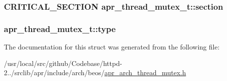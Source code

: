 \subsubsection[{\texorpdfstring{section}{section}}]{\setlength{\rightskip}{0pt plus 5cm}C\+R\+I\+T\+I\+C\+A\+L\+\_\+\+S\+E\+C\+T\+I\+ON apr\+\_\+thread\+\_\+mutex\+\_\+t\+::section}\hypertarget{structapr__thread__mutex__t_a67f2e859a45c82fb49b78ff4a68032f8}{}\label{structapr__thread__mutex__t_a67f2e859a45c82fb49b78ff4a68032f8}
\subsubsection[{\texorpdfstring{type}{type}}]{ apr\+\_\+thread\+\_\+mutex\+\_\+t\+::type}\hypertarget{structapr__thread__mutex__t_a3b96f37b2e946e6308b4cac3d72fecc7}{}\label{structapr__thread__mutex__t_a3b96f37b2e946e6308b4cac3d72fecc7}


The documentation for this struct was generated from the following file\+:\begin{DoxyCompactItemize}
\item 
/usr/local/src/github/\+Codebase/httpd-\/2../srclib/apr/include/arch/beos/\hyperlink{beos_2apr__arch__thread__mutex_8h}{apr\+\_\+arch\+\_\+thread\+\_\+mutex.\+h}\end{DoxyCompactItemize}
